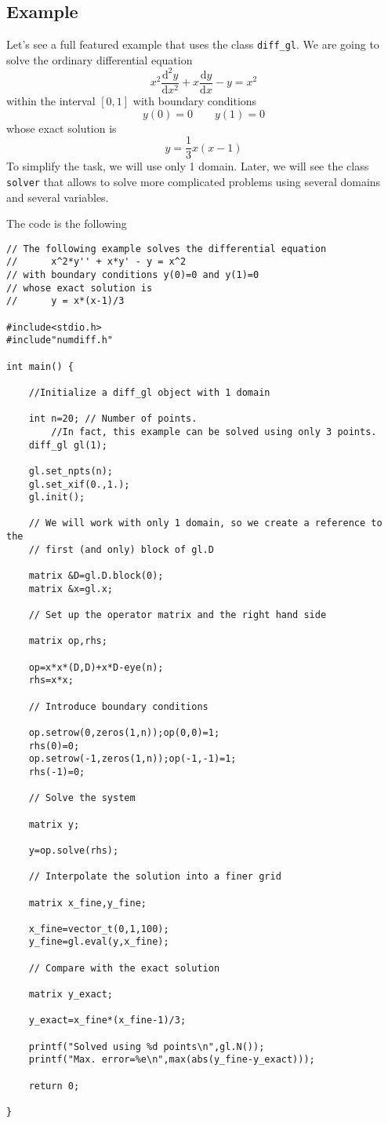 \subsection{Example}

Let's see a full featured example that uses the class \texttt{diff\_gl}.
We are going to solve the ordinary differential equation
$$x^2\frac{\mathrm{d}^2y}{\mathrm{d}x^2}+x\frac{\mathrm{d}y}{\mathrm{d}x}-y=x^2$$
within the interval $[0,1]$ with boundary conditions
$$y(0)=0 \qquad y(1)=0$$
whose exact solution is
$$y=\frac{1}{3}x(x-1)$$
To simplify the task, we will use only 1 domain. Later, we will see the class \texttt{solver} that
allows to solve more complicated problems using several domains and several variables.

The code is the following

\begin{verbatim}
// The following example solves the differential equation
//		x^2*y'' + x*y' - y = x^2
// with boundary conditions y(0)=0 and y(1)=0
// whose exact solution is
//      y = x*(x-1)/3		

#include<stdio.h>
#include"numdiff.h"

int main() {
	
	//Initialize a diff_gl object with 1 domain 

	int n=20; // Number of points. 
		//In fact, this example can be solved using only 3 points.
	diff_gl gl(1);
	
	gl.set_npts(n);
	gl.set_xif(0.,1.);
	gl.init();
	
	// We will work with only 1 domain, so we create a reference to the 
	// first (and only) block of gl.D
	
	matrix &D=gl.D.block(0);
	matrix &x=gl.x;
	
	// Set up the operator matrix and the right hand side
	
	matrix op,rhs;
	
	op=x*x*(D,D)+x*D-eye(n);
	rhs=x*x;
	
	// Introduce boundary conditions
	
	op.setrow(0,zeros(1,n));op(0,0)=1;
	rhs(0)=0;
	op.setrow(-1,zeros(1,n));op(-1,-1)=1;
	rhs(-1)=0;
	
	// Solve the system
	
	matrix y;
	
	y=op.solve(rhs);
	
	// Interpolate the solution into a finer grid
	
	matrix x_fine,y_fine;
	
	x_fine=vector_t(0,1,100);
	y_fine=gl.eval(y,x_fine);
	
	// Compare with the exact solution
	
	matrix y_exact;
	
	y_exact=x_fine*(x_fine-1)/3;
	
	printf("Solved using %d points\n",gl.N());
	printf("Max. error=%e\n",max(abs(y_fine-y_exact)));
	
	return 0;	
	
}
\end{verbatim}


